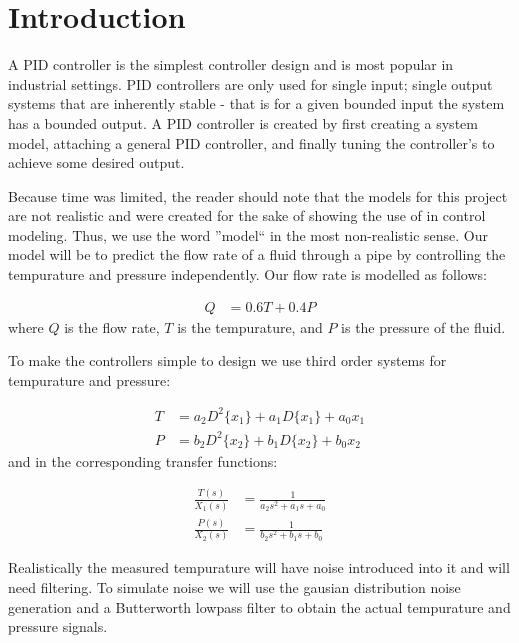 \documentclass[main.tex]{subfile}
\begin{document}
\section{Introduction} 
\label{sec:introduction}

A PID controller is the simplest controller design and is most popular in
industrial settings. PID controllers are only used for single input; single
output systems that are inherently stable - that is for a given bounded input the
system has a bounded output. A PID controller is created by first creating a
system model, attaching a general PID controller, and finally tuning the
controller's to achieve some desired output. 

Because time was limited, the reader should note that the models for this
project are not realistic and were created for the sake of showing the use of
\Labview in control modeling. Thus, we use the word ''model`` in the most
non-realistic sense. Our model will be to predict the flow rate of a fluid
through a pipe by controlling the tempurature and pressure independently. Our
flow rate is modelled as follows: 

\begin{align}
	Q &= 0.6T+0.4P \label{eq:flowRate}
\end{align}
where $Q$ is the flow rate, $T$ is the tempurature, and $P$ is the pressure of
the fluid.

To make the controllers simple to design we use third order systems for
tempurature and pressure:

\begin{align}
	T &= a_2D^2\{x_1\} + a_1D\{x_1\} + a_0x_1
	\\P &= b_2D^2\{x_2\} + b_1D\{x_2\} + b_0x_2
\end{align}
and in the corresponding transfer functions:

\begin{align}
	\frac{T(s)}{X_1(s)} &= \frac{1}{a_2s^2+a_1s+a_0}
	\\\frac{P(s)}{X_2(s)} &= \frac{1}{b_2s^2+b_1s+b_0}
\end{align}

Realistically the measured tempurature will have noise introduced into it and
will need filtering. To simulate noise we will use the gausian distribution
noise generation and a Butterworth lowpass filter to obtain the actual
tempurature and pressure signals.


\end{document}
